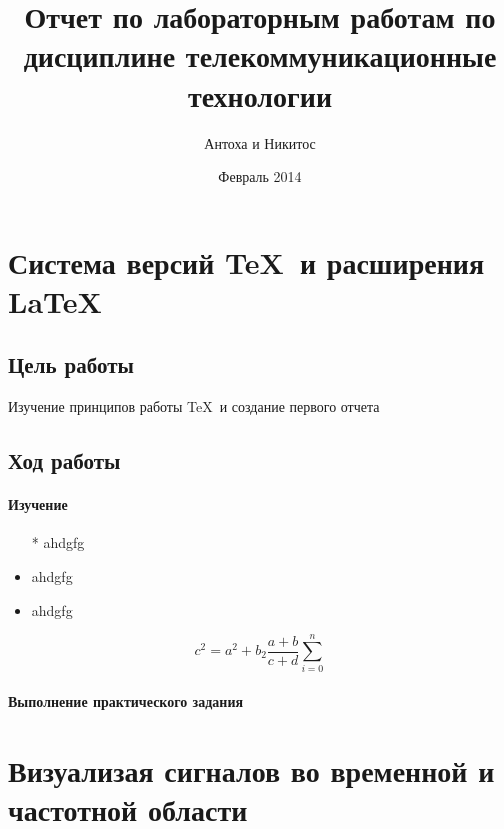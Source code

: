 \documentclass[10pt,a4paper]{article}
\author{Антоха и Никитос}
\title{Отчет по лабораторным работам по дисциплине телекоммуникационные технологии}
\date{Февраль 2014}
\begin{document}
\maketitle
\tableofcontents
\pagebreak
\section{Система версий \TeX\  и расширения \LaTeX}
\subsection{Цель работы}
Изучение принципов работы \TeX\ и создание первого отчета
\subsection{Ход работы}
\paragraph{Изучение}
\begin{itemize}
\item[*] ahdgfg
\item ahdgfg
\item ahdgfg
\end{itemize}
\begin{displaymath}
c^{2}=a^{2}+b_{2}\frac{a+b}{c+d}
\sum_{i=0}^{n}
\end{displaymath}
\paragraph{Выполнение практического задания}
\section{Визуализая сигналов во временной и частотной области}
\end{document}
